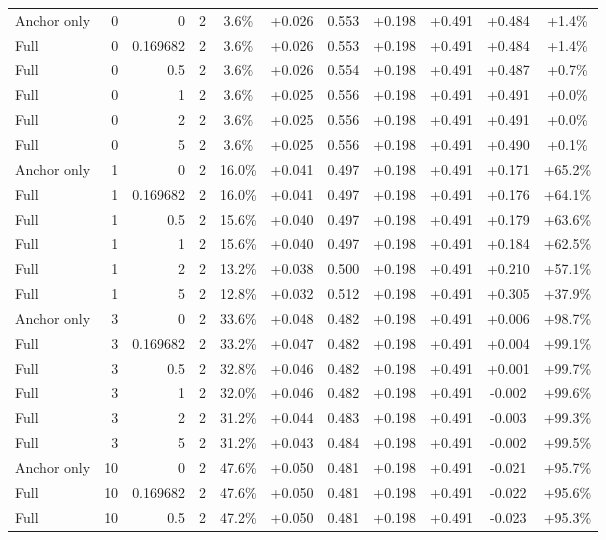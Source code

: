 \begin{table}[htbp]
\begin{tabular}{lrrrccccccc}
Anchor only & 0 & 0 & 2 & 3.6\% & +0.026 & 0.553 & +0.198 & +0.491 & +0.484 & +1.4\% \\
Full & 0 & 0.169682 & 2 & 3.6\% & +0.026 & 0.553 & +0.198 & +0.491 & +0.484 & +1.4\% \\
Full & 0 & 0.5 & 2 & 3.6\% & +0.026 & 0.554 & +0.198 & +0.491 & +0.487 & +0.7\% \\
Full & 0 & 1 & 2 & 3.6\% & +0.025 & 0.556 & +0.198 & +0.491 & +0.491 & +0.0\% \\
Full & 0 & 2 & 2 & 3.6\% & +0.025 & 0.556 & +0.198 & +0.491 & +0.491 & +0.0\% \\
Full & 0 & 5 & 2 & 3.6\% & +0.025 & 0.556 & +0.198 & +0.491 & +0.490 & +0.1\% \\
Anchor only & 1 & 0 & 2 & 16.0\% & +0.041 & 0.497 & +0.198 & +0.491 & +0.171 & +65.2\% \\
Full & 1 & 0.169682 & 2 & 16.0\% & +0.041 & 0.497 & +0.198 & +0.491 & +0.176 & +64.1\% \\
Full & 1 & 0.5 & 2 & 15.6\% & +0.040 & 0.497 & +0.198 & +0.491 & +0.179 & +63.6\% \\
Full & 1 & 1 & 2 & 15.6\% & +0.040 & 0.497 & +0.198 & +0.491 & +0.184 & +62.5\% \\
Full & 1 & 2 & 2 & 13.2\% & +0.038 & 0.500 & +0.198 & +0.491 & +0.210 & +57.1\% \\
Full & 1 & 5 & 2 & 12.8\% & +0.032 & 0.512 & +0.198 & +0.491 & +0.305 & +37.9\% \\
Anchor only & 3 & 0 & 2 & 33.6\% & +0.048 & 0.482 & +0.198 & +0.491 & +0.006 & +98.7\% \\
Full & 3 & 0.169682 & 2 & 33.2\% & +0.047 & 0.482 & +0.198 & +0.491 & +0.004 & +99.1\% \\
Full & 3 & 0.5 & 2 & 32.8\% & +0.046 & 0.482 & +0.198 & +0.491 & +0.001 & +99.7\% \\
Full & 3 & 1 & 2 & 32.0\% & +0.046 & 0.482 & +0.198 & +0.491 & -0.002 & +99.6\% \\
Full & 3 & 2 & 2 & 31.2\% & +0.044 & 0.483 & +0.198 & +0.491 & -0.003 & +99.3\% \\
Full & 3 & 5 & 2 & 31.2\% & +0.043 & 0.484 & +0.198 & +0.491 & -0.002 & +99.5\% \\
Anchor only & 10 & 0 & 2 & 47.6\% & +0.050 & 0.481 & +0.198 & +0.491 & -0.021 & +95.7\% \\
Full & 10 & 0.169682 & 2 & 47.6\% & +0.050 & 0.481 & +0.198 & +0.491 & -0.022 & +95.6\% \\
Full & 10 & 0.5 & 2 & 47.2\% & +0.050 & 0.481 & +0.198 & +0.491 & -0.023 & +95.3\% \\

\end{tabular}
\end{table}
